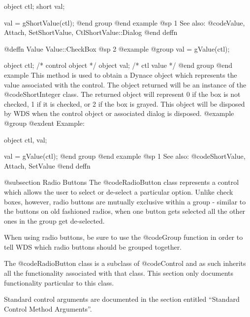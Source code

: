 {object  ctl;
short   val;

val = gShortValue(ctl);
@end group
@end example
@sp 1
See also:  @code{Value, Attach, SetShortValue, CtlShortValue::Dialog}
@end deffn













@deffn {Value} Value::CheckBox
@sp 2
@example
@group
val = gValue(ctl);

object  ctl;   /*  control object  */
object  val;   /*  ctl value       */
@end group
@end example
This method is used to obtain a Dynace object which represents the value
associated with the control.  The object returned will be an instance of
the @code{ShortInteger} class.  The returned object will represent 0 if
the box is not checked, 1 if it is checked, or 2 if the box is grayed.
This object will be disposed by WDS when the control object or
associated dialog is disposed.
@example
@group
@exdent Example:

object  ctl, val;

val = gValue(ctl);
@end group
@end example
@sp 1
See also:  @code{ShortValue, Attach, SetValue}
@end deffn















@subsection Radio Buttons
The @code{RadioButton} class represents a control which allows the user
to select or de-select a particular option.  Unlike check boxes, however,
radio buttons are mutually exclusive within a group - similar to the
buttons on old fashioned radios, when one button gets selected all the
other ones in the group get de-selected.

When using radio buttons, be sure to use the @code{Group} function in order
to tell WDS which radio buttons should be grouped together.

The @code{RadioButton} class is a subclass of @code{Control} and as such
inherits all the functionality associated with that class.  This section
only documents functionality particular to this class.

Standard control arguments are documented in the section entitled
``Standard Control Method Arguments''.






}
